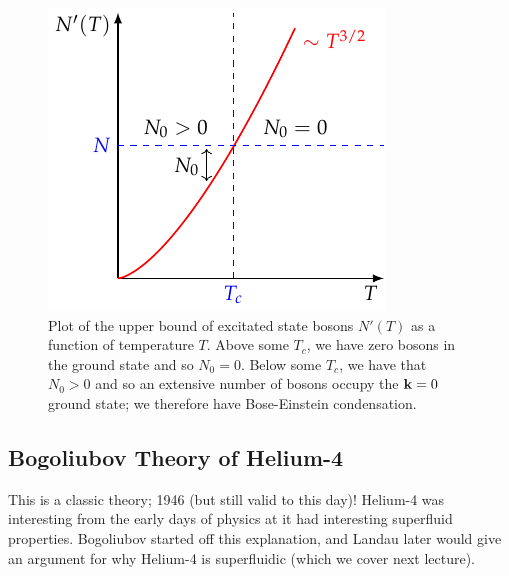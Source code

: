 \begin{figure}[htbp]
    \centering
    \includegraphics[]{Images/fig-superfluidN.pdf}
    \caption{Plot of the upper bound of excitated state bosons $N'(T)$ as a function of temperature $T$. Above some $T_c$, we have zero bosons in the ground state and so $N_0 = 0$. Below some $T_c$, we have that $N_0 > 0$ and so an extensive number of bosons occupy the $\mathbf{k} = 0$ ground state; we therefore have Bose-Einstein condensation.}
    \label{fig-superfluidN}
\end{figure}

\subsection{Bogoliubov Theory of Helium-4}
This is a classic theory; 1946 (but still valid to this day)! Helium-4 was interesting from the early days of physics at it had interesting superfluid properties. Bogoliubov started off this explanation, and Landau later would give an argument for why Helium-4 is superfluidic (which we cover next lecture).


